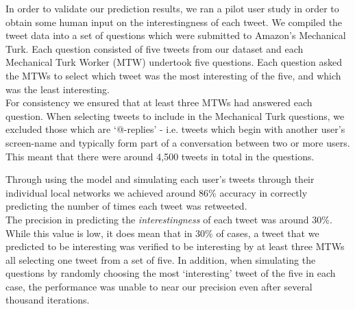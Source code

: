 In order to validate our prediction results, we ran a pilot user study in order to obtain some human input on the interestingness of each tweet. We compiled the tweet data into a set of questions which were submitted to Amazon's Mechanical Turk. Each question consisted of five tweets from our dataset and each Mechanical Turk Worker (MTW) undertook five questions. Each question asked the MTWs to select which tweet was the most interesting of the five, and which was the least interesting.
\\
For consistency we ensured that at least three MTWs had answered each question. When selecting tweets to include in the Mechanical Turk questions, we excluded those which are `@-replies' - i.e. tweets which begin with another user's screen-name and typically form part of a conversation between two or more users. This meant that there were around 4,500 tweets in total in the questions.

Through using the model and simulating each user's tweets through their individual local networks we achieved around 86\% accuracy in correctly predicting the number of times each tweet was retweeted. 
\\
The precision in predicting the \textit{interestingness} of each tweet was around 30\%. While this value is low, it does mean that in 30\% of cases, a tweet that we predicted to be interesting was verified to be interesting by at least three MTWs all selecting one tweet from a set of five. In addition, when simulating the questions by randomly choosing the most `interesting' tweet of the five in each case, the performance was unable to near our precision even after several thousand iterations.

